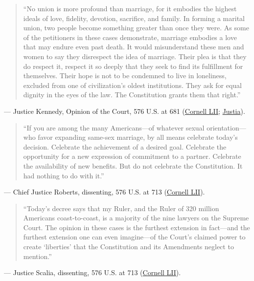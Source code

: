 \documentclass[12pt]{article}
\begin{document}
\begin{quote}
``No union is more profound than marriage, for it embodies the highest ideals of love, fidelity, devotion, sacrifice, and family. In forming a marital union, two people become something greater than once they were. As some of the petitioners in these cases demonstrate, marriage embodies a love that may endure even past death. It would misunderstand these men and women to say they disrespect the idea of marriage. Their plea is that they do respect it, respect it so deeply that they seek to find its fulfillment for themselves. Their hope is not to be condemned to live in loneliness, excluded from one of civilization's oldest institutions. They ask for equal dignity in the eyes of the law. The Constitution grants them that right.''
\end{quote}
\noindent --- Justice Kennedy, Opinion of the Court, 576 U.S. at 681 (\href{https://www.law.cornell.edu/supremecourt/text/14-556}{Cornell LII}; \href{https://supreme.justia.com/cases/federal/us/576/644/}{Justia}).

\begin{quote}
``If you are among the many Americans---of whatever sexual orientation---who favor expanding same-sex marriage, by all means celebrate today's decision. Celebrate the achievement of a desired goal. Celebrate the opportunity for a new expression of commitment to a partner. Celebrate the availability of new benefits. But do not celebrate the Constitution. It had nothing to do with it.''
\end{quote}
\noindent --- Chief Justice Roberts, dissenting, 576 U.S. at 713 (\href{https://www.law.cornell.edu/supremecourt/text/14-556}{Cornell LII}).

\begin{quote}
``Today's decree says that my Ruler, and the Ruler of 320 million Americans coast-to-coast, is a majority of the nine lawyers on the Supreme Court. The opinion in these cases is the furthest extension in fact---and the furthest extension one can even imagine---of the Court's claimed power to create `liberties' that the Constitution and its Amendments neglect to mention.''
\end{quote}
\noindent --- Justice Scalia, dissenting, 576 U.S. at 713 (\href{https://www.law.cornell.edu/supremecourt/text/14-556}{Cornell LII}).
\end{document}
